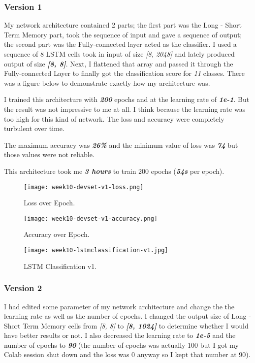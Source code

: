 \subsubsection{Version 1}
My network architecture contained 2 parts; the first part was the Long - Short Term Memory part, took the sequence of input and gave a sequence of output; the second part was the Fully-connected layer acted as the classifier. I used a sequence of 8 LSTM cells took in input of size \emph{[8, 2048]} and lately produced output of size \textbf{\emph{[8, 8]}}. Next, I flattened that array and passed it through the Fully-connected Layer to finally got the classification score for \emph{11} classes. There was a figure below to demonstrate exactly how my architecture was.

I trained this architecture with \textbf{\emph{200}} epochs and at the learning rate of \textbf{\emph{1e-1}}. But the result was not impressive to me at all. I think because the learning rate was too high for this kind of network. The loss and accuracy were completely turbulent over time.

The maximum accuracy was \textbf{\emph{26\%}} and the minimum value of loss was \textbf{\emph{74}} but those values were not reliable.

This architecture took me \textbf{\emph{3 hours}} to train 200 epochs (\textbf{\emph{54s}} per epoch).

\begin{figure}[!ht]
\centering
\texttt{[image: week10-devset-v1-loss.png]}
\caption{Loss over Epoch.}
\end{figure}

\newpage
\begin{figure}[!ht]
\centering
\texttt{[image: week10-devset-v1-accuracy.png]}
\caption{Accuracy over Epoch.}
\end{figure}

\begin{figure}[!ht]
\centering
\texttt{[image: week10-lstmclassification-v1.jpg]}
\caption{LSTM Classification v1.}
\end{figure}

\newpage
\subsubsection{Version 2}
I had edited some parameter of my network architecture and change the the learning rate as well as the number of epochs. I changed the output size of Long - Short Term Memory cells from \emph{[8, 8]} to \textbf{\emph{[8, 1024]}} to determine whether I would have better results or not. I also decreased the learning rate to \textbf{\emph{1e-5}} and the number of epochs to \textbf{\emph{90}} (the number of epochs was actually 100 but I got my Colab session shut down and the loss was 0 anyway so I kept that number at 90).

